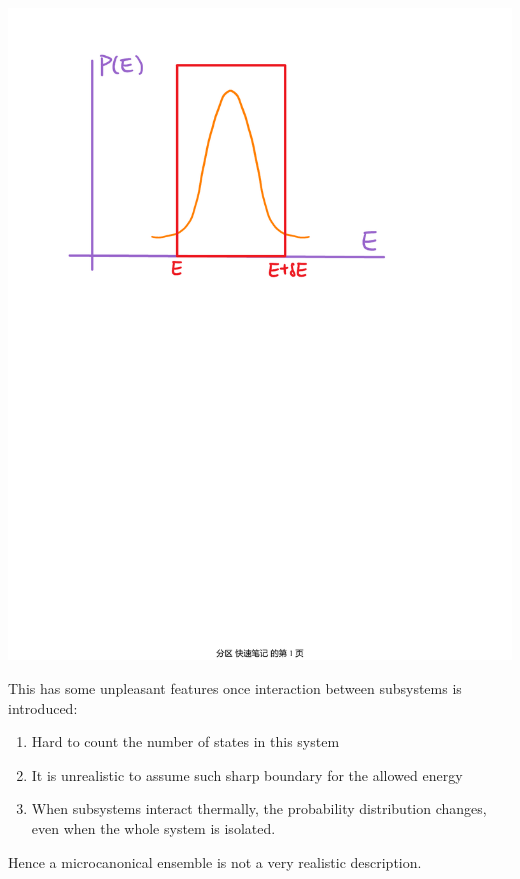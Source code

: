 \documentclass[11pt,oneside]{book}
\theoremstyle{break}
\theoremstyle{break}
\begin{document}
\begin{center}
\includegraphics[scale=0.5]{peak.pdf}
\end{center}

This has some unpleasant features once interaction between subsystems is introduced:
\begin{enumerate}[topsep=3pt,itemsep=-1ex,partopsep=1ex,parsep=1ex]
\item Hard to count the number of states in this system
\item It is unrealistic to assume such sharp boundary for the allowed energy
\item When subsystems interact thermally, the probability distribution changes, even when the whole system is isolated. 
\end{enumerate}
Hence a microcanonical ensemble is not a very realistic description. \\
\end{document}
